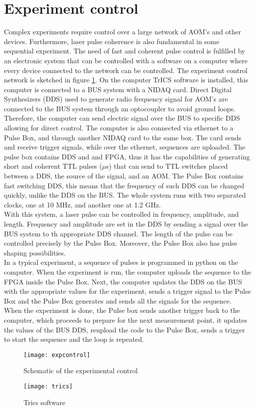 \section{Experiment control}
Complex experiments require control over a large network of AOM's and other devices. Furthermore, laser pulse coherence is also fundamental in some sequential experiment. The need of fast and coherent pulse control is fulfilled by an electronic system that can be controlled with a software on a computer where every device connected to the network can be controlled. The experiment control network is sketched in figure \ref{expcontrol}. On the computer TrICS software is installed, this computer is connected to a BUS system with a NIDAQ card. Direct Digital Synthesizers (DDS) used to generate radio frequency signal for AOM's are connected to the BUS system through an optocoupler to avoid ground loops. Therefore, the computer can send electric signal over the BUS to specific DDS allowing for direct control. The computer is also connected via ethernet to a Pulse Box, and through another NIDAQ card to the same box. The card sends and receive trigger signals, while over the ethernet, sequences are uploaded. The pulse box contains DDS and and FPGA, thus it has the capabilities of generating short and coherent TTL pulses ($\mu$s) that can send to TTL switches placed between a DDS, the source of the signal, and an AOM. The Pulse Box contains fast switching DDS, this means that the frequency of such DDS can be changed quickly, unlike the DDS on the BUS. The whole system runs with two separated clocks, one at 10 MHz, and another one at 1.2 GHz.\\
With this system, a laser pulse can be controlled in frequency, amplitude, and length. Frequency and amplitude are set in the DDS by sending a signal over the BUS system to th appropriate DDS channel. The length of the pulse can be controlled precisely by the Pulse Box. Moreover, the Pulse Box also has pulse shaping possibilities.\\
In a typical experiment, a sequence of pulses is programmed in python on the computer. When the experiment is run, the computer uploads the sequence to the FPGA inside the Pulse Box. Next, the computer updates the DDS on the BUS with the appropriate values for the experiment, sends a trigger signal to the Pulse Box and the Pulse Box generates and sends all the signals for the sequence. When the experiment is done, the Pulse box sends another trigger back to the computer, which proceeds to prepare for the next measurement point, it updates the values of the BUS DDS, reupload the code to the Pulse Box, sends a trigger to start the sequence and the loop is repeated.

\begin{figure}
\centering
\texttt{[image: expcontrol]}
\caption{Schematic of the experimental control}
\label{expcontrol}
\end{figure}

\begin{figure}
\centering
\texttt{[image: trics]}
\caption{Trics software}
\label{trics}
\end{figure}
